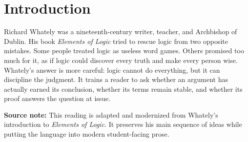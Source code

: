 \documentclass[12pt]{article}
\newcommand{\focusbox}[1]{\par\vspace{0.4em}\noindent\begingroup\setlength{\fboxsep}{6pt}\colorbox{gray!12}{\begin{minipage}{\dimexpr\linewidth-2\fboxsep\relax}#1\end{minipage}}\endgroup\par\vspace{0.5em}}
\begin{document}
\section*{Introduction}
Richard Whately was a nineteenth-century writer, teacher, and Archbishop of Dublin. His book \textit{Elements of Logic} tried to rescue logic from two opposite mistakes. Some people treated logic as useless word games. Others promised too much for it, as if logic could discover every truth and make every person wise. Whately's answer is more careful: logic cannot do everything, but it can discipline the judgment. It trains a reader to ask whether an argument has actually earned its conclusion, whether its terms remain stable, and whether its proof answers the question at issue.

\focusbox{\textbf{Source note:} This reading is adapted and modernized from Whately's introduction to \textit{Elements of Logic}. It preserves his main sequence of ideas while putting the language into modern student-facing prose.}
\end{document}
